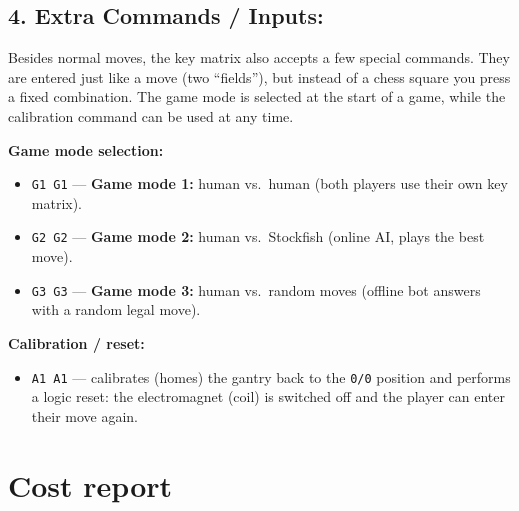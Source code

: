 \documentclass[10pt]{article}
\begin{document}
\subsection{4. Extra Commands / Inputs:}
Besides normal moves, the key matrix also accepts a few special commands. They are
entered just like a move (two ``fields''), but instead of a chess square you press a
fixed combination. The game mode is selected at the start of a game, while the
calibration command can be used at any time.

\textbf{Game mode selection:}
\begin{itemize}
    \item \texttt{G1 G1} --- \textbf{Game mode 1:} human vs.\ human (both players use their own key matrix).
    \item \texttt{G2 G2} --- \textbf{Game mode 2:} human vs.\ Stockfish (online AI, plays the best move).
    \item \texttt{G3 G3} --- \textbf{Game mode 3:} human vs.\ random moves (offline bot answers with a random legal move).
\end{itemize}

\textbf{Calibration / reset:}
\begin{itemize}
    \item \texttt{A1 A1} --- calibrates (homes) the gantry back to the \texttt{0/0} position
          and performs a logic reset: the electromagnet (coil) is switched off and the
          player can enter their move again.
\end{itemize}


\newpage

\section{Cost report}
\end{document}
